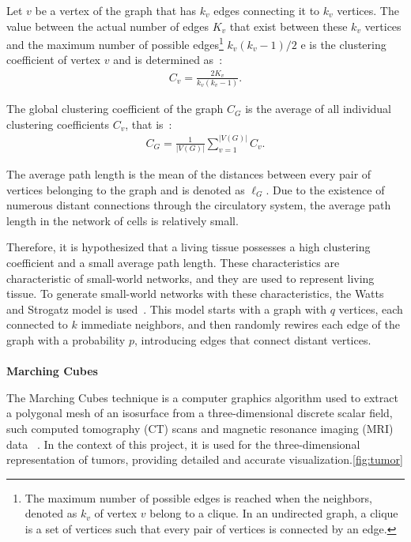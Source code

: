 \documentclass[a4paper,11pt]{article}
\begin{document}
{Let $v$ be a vertex of the graph that has $k_v$ edges connecting it to $k_v$ vertices. The value between the actual number of edges $K_v$ that exist between these $k_v$ vertices and the maximum number of possible edges\footnote{The maximum number of possible edges is reached when the neighbors, denoted as $k_v$ of vertex $v$ belong to a clique. In an undirected graph, a clique is a set of vertices such that every pair of vertices is connected by an edge.} $k_v(k_v-1)/2$ e is the clustering coefficient of vertex $v$ and is determined as~\cite{7}:
\begin{align}
C_v = \displaystyle\frac{2K_v}{k_v(k_v-1)}. \label{eq-clustering}
\end{align}

The global clustering coefficient of the graph $C_G$ is the average of all individual clustering coefficients $C_v$, that is~\cite{7}:
\begin{align}
C_G = \displaystyle\frac{1}{|V(G)|}\sum _{v=1} ^{|V(G)|} C_v. \label{eq-global-clustering}
\end{align}

The average path length is the mean of the distances between every pair of vertices belonging to the graph and is denoted as $\ell_G$. Due to the existence of numerous distant connections through the circulatory system, the average path length in the network of cells is relatively small.

Therefore, it is hypothesized that a living tissue possesses a high clustering coefficient and a small average path length. These characteristics are characteristic of small-world networks, and they are used to represent living tissue. To generate small-world networks with these characteristics, the Watts and Strogatz model is used~\cite{9}. This model starts with a graph with $q$ vertices, each connected to $k$ immediate neighbors, and then randomly rewires each edge of the graph with a probability $p$, introducing edges that connect distant vertices.\\
\\
\textbf{Marching Cubes}

The Marching Cubes technique is a computer graphics algorithm used to extract a polygonal mesh of an isosurface from a three-dimensional discrete scalar field, such computed tomography (CT) scans and magnetic resonance imaging (MRI) data ~\cite{5}. In the context of this project, it is used for the three-dimensional representation of tumors, providing detailed and accurate visualization.\ref{fig:tumor}

}
\end{document}

